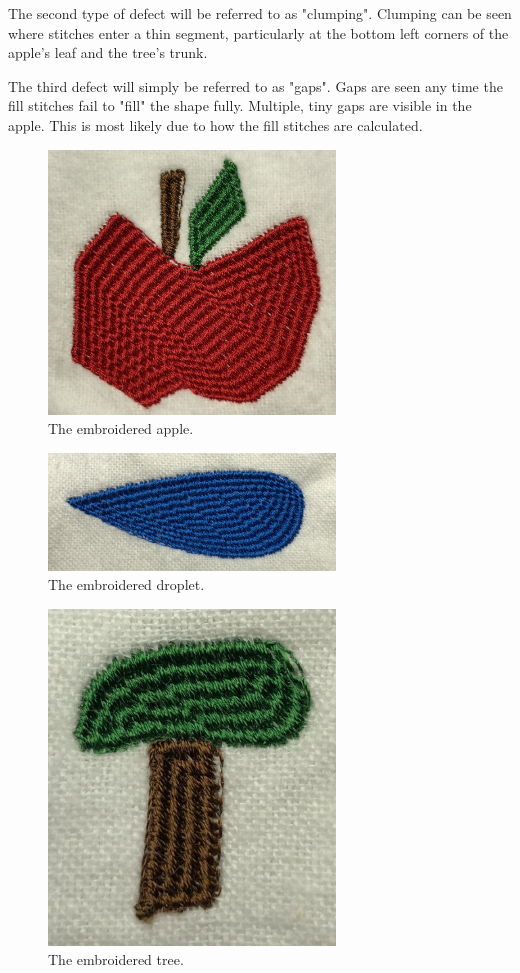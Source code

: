 \documentclass{article}
\begin{document}
The second type of defect will be referred to as "clumping". Clumping can be seen where stitches enter a thin segment, particularly at the bottom left corners of the apple's leaf and the tree's trunk.

The third defect will simply be referred to as "gaps". Gaps are seen any time the fill stitches fail to "fill" the shape fully. Multiple, tiny gaps are visible in the apple. This is most likely due to how the fill stitches are calculated.

\begin{figure}[H]
    \centering
    \includegraphics[width=3in]{apple}
    \caption{The embroidered apple.}
    \label{apple}
\end{figure}

\begin{figure}[H]
    \centering
    \includegraphics[width=3in]{droplet}
    \caption{The embroidered droplet.}
    \label{droplet}
\end{figure}

\begin{figure}[H]
    \centering
    \includegraphics[width=3in]{tree}
    \caption{The embroidered tree.}
    \label{tree}
\end{figure}
\end{document}
